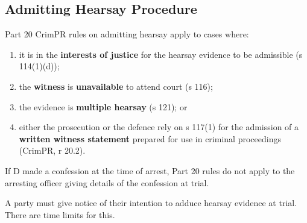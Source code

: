 \documentclass[
]{article}
\newenvironment{Shaded}{}{}
\newcommand{\NormalTok}[1]{#1}
\providecommand{\tightlist}{%
  \setlength{\itemsep}{0pt}\setlength{\parskip}{0pt}}
\begin{document}
\hypertarget{admitting-hearsay-procedure}{%
\subsection{Admitting Hearsay
Procedure}\label{admitting-hearsay-procedure}}

Part 20 CrimPR rules on admitting hearsay apply to cases where:

\begin{enumerate}
\def\labelenumi{\arabic{enumi}.}
\tightlist
\item
  it is in the \textbf{interests of justice} for the hearsay evidence to
  be admissible (s 114(1)(d));
\item
  the \textbf{witness} is \textbf{unavailable} to attend court (s 116);
\item
  the evidence is \textbf{multiple hearsay} (s 121); or
\item
  either the prosecution or the defence rely on s 117(1) for the
  admission of a \textbf{written witness statement} prepared for use in
  criminal proceedings (CrimPR, r 20.2).
\end{enumerate}

\begin{Shaded}
\begin{Highlighting}[]
\NormalTok{If D made a confession at the time of arrest, Part 20 rules do not apply to the arresting officer giving details of the confession at trial. }
\end{Highlighting}
\end{Shaded}

A party must give notice of their intention to adduce hearsay evidence
at trial. There are time limits for this.
\end{document}
